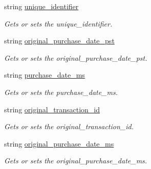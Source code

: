 \begin{DoxyCompactItemize}
\item 
string \mbox{\hyperlink{class_t_net_1_1_contract_1_1_action_1_1_app_store_pay_action_1_1_receipt_ac626fe5260ed127fe224dbf07ea61f14}{unique\+\_\+identifier}}
\begin{DoxyCompactList}\small\item\em Gets or sets the unique\+\_\+identifier. \end{DoxyCompactList}\item 
string \mbox{\hyperlink{class_t_net_1_1_contract_1_1_action_1_1_app_store_pay_action_1_1_receipt_a38c358eb6dc53c9871aac738463c5097}{original\+\_\+purchase\+\_\+date\+\_\+pst}}
\begin{DoxyCompactList}\small\item\em Gets or sets the original\+\_\+purchase\+\_\+date\+\_\+pst. \end{DoxyCompactList}\item 
string \mbox{\hyperlink{class_t_net_1_1_contract_1_1_action_1_1_app_store_pay_action_1_1_receipt_ad8285bf48431a8844ef63da6c19b3056}{purchase\+\_\+date\+\_\+ms}}
\begin{DoxyCompactList}\small\item\em Gets or sets the purchase\+\_\+date\+\_\+ms. \end{DoxyCompactList}\item 
string \mbox{\hyperlink{class_t_net_1_1_contract_1_1_action_1_1_app_store_pay_action_1_1_receipt_a09b13d3b75b06a4811f065490536918c}{original\+\_\+transaction\+\_\+id}}
\begin{DoxyCompactList}\small\item\em Gets or sets the original\+\_\+transaction\+\_\+id. \end{DoxyCompactList}\item 
string \mbox{\hyperlink{class_t_net_1_1_contract_1_1_action_1_1_app_store_pay_action_1_1_receipt_a55cf1c6d1c59569b439dacc56dc886b4}{original\+\_\+purchase\+\_\+date\+\_\+ms}}
\begin{DoxyCompactList}\small\item\em Gets or sets the original\+\_\+purchase\+\_\+date\+\_\+ms. \end{DoxyCompactList}\item 

\end{DoxyCompactItemize}
